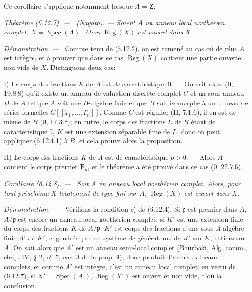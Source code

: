 \documentclass[10pt,oneside]{book}
\newcommand{\oldpage}[2][]{%
  \setcounter{footnote}{0}%
  \marginpar{\scriptsize\textbf{#1}~|~#2}\ignorespaces}
\newenvironment{theorem}[1][]{%
  \par\medskip\noindent\itshape Théorème (#1). ---\ }{\par}
\newenvironment{corollary}[1][]{%
  \par\medskip\noindent\itshape Corollaire (#1). ---\ }{\par}
\newenvironment{proof}{%
  \par\medskip\noindent\textit{Démonstration. ---\ }}{\par}
\begin{document}
Ce corollaire s'applique notamment lorsque $A=\mathbf Z$.

\begin{theorem}[6.12.7]
\label{IV.2.s6.12.7-fr}
\textnormal{(Nagata).} --- Soient $A$ un anneau local noethérien complet,
$X=\operatorname{Spec}(A)$. Alors $\operatorname{Reg}(X)$ est ouvert dans
$X$.
\end{theorem}

\begin{proof}
Compte tenu de (6.12.2), on est ramené au cas où de plus $A$ est intègre, et
à prouver que dans ce cas $\operatorname{Reg}(X)$ contient une partie
ouverte non vide de $X$. Distinguons deux cas:

\oldpage[IV-2]{167}
I) Le corps des fractions $K$ de $A$ est de caractéristique 0. --- On sait
alors (0, 19.8.8) qu'il existe un anneau de valuation discrète complet $C$
et un sous-anneau $B$ de $A$ tel que $A$ soit une $B$-algèbre finie et que
$B$ soit isomorphe à un anneau de séries formelles
$C[[T_1,\ldots,T_n]]$. Comme $C$ est régulier (II, 7.1.6), il en est de
même de $B$ (0, 17.3.8); en outre, le corps des fractions $L$ de $B$ étant
de caractéristique 0, $K$ est une extension séparable finie de $L$, donc on
peut appliquer (6.12.4.1) à $B$, et cela prouve alors la proposition.

II) Le corps des fractions $K$ de $A$ est de caractéristique $p>0$. ---
Alors $A$ contient le corps premier $\mathbf F_p$, et le théorème a été
prouvé dans ce cas (0, 22.7.6).
\end{proof}

\begin{corollary}[6.12.8]
\label{IV.2.s6.12.8-fr}
Soit $A$ un anneau local noethérien complet. Alors, pour tout préschéma $X$
localement de type fini sur $A$, $\operatorname{Reg}(X)$ est ouvert dans
$X$.
\end{corollary}

\begin{proof}
Vérifions la condition c) de (6.12.4). Si $\mathfrak p$ est premier dans
$A$, $A/\mathfrak p$ est encore un anneau local noethérien complet; si $K'$
est une extension finie du corps des fractions $K$ de $A/\mathfrak p$, $K'$
est corps des fractions d'une sous-$A$-algèbre finie $A'$ de $K'$, engendrée
par un système de générateurs de $K'$ sur $K$, entiers sur $A$. On sait
alors que $A'$ est un anneau semi-local complet (Bourbaki, Alg. comm.,
chap. IV, § 2, n$^o$ 5, cor. 3 de la prop. 9), donc produit d'anneaux locaux
complets, et comme $A'$ est intègre, c'est un anneau local complet; en vertu
de (6.12.7), si $X'=\operatorname{Spec}(A')$,
$\operatorname{Reg}(X')$ est ouvert et non vide, d'où la conclusion.
\end{proof}
\end{document}
